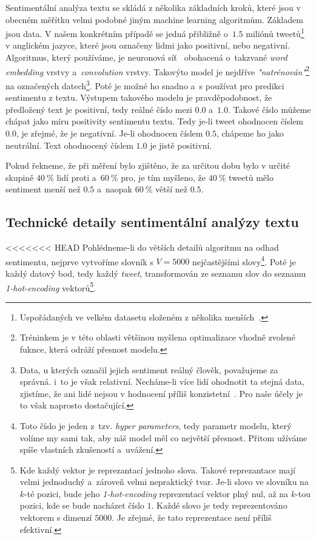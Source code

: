 \documentclass[12pt, a4paper]{article}
\numberwithin{equation}{section} 	%
\begin{document}
Sentimentální analýza textu se skládá z několika základních kroků, které jsou v obecném měřítku velmi podobné jiným machine learning algoritmům. Základem jsou data. V našem konkrétním případě se jedná přibližně o~$1.5$ miliónů tweetů\footnote{Uspořádaných ve velkém datasetu složeném z několika menších~\cite{TwitterData1, TwitterData2}.} v anglickém jazyce, které jsou označeny lidmi jako positivní, nebo negativní. Algoritmus, který používáme, je neuronová síť~\cite{TwitterSentAnalysis} obohacená o~takzvané \textit{word embedding} vrstvy a~\textit{convolution} vrstvy. Takovýto model je nejdříve \textit{"natrénován"}\footnote{Tréninkem je v této oblasti většinou myšlena optimalizace vhodně zvolené fuknce, která odráží přesnost modelu.} na označených datech\footnote{Data, u kterých označil jejich sentiment reálný člověk, považujeme za správná. i~to je však relativní. Necháme-li více lidí ohodnotit ta stejná data, zjistíme, že ani lidé nejsou v hodnocení příliš konzistetní~\cite{HumanVsMachineLearning}. Pro naše účely je to však naprosto dostačující.}. Poté je možné ho snadno a~s používat pro predikci sentimentu z textu. Výstupem takového modelu je pravděpodobnost, že předložený text je positivní, tedy reálné číslo mezi $0.0$ a~$1.0$. Takové číslo můžeme chápat jako míru positivity sentimentu textu. Tedy je-li tweet ohodnocen číslem $0.0$, je zřejmé, že je negativní. Je-li ohodnocen číslem $0.5$, chápeme ho jako neutrální. Text ohodnocený číslem $1.0$ je jistě positivní.

Pokud řekneme, že při měření bylo zjištěno, že za určitou dobu bylo v určité skupině $40~\%$ lidí proti a~$60~\%$ pro, je tím myšleno, že $40~\%$ tweetů mělo sentiment menší než $0.5$ a~naopak $60~\%$ větší než $0.5$.

\subsection{Technické detaily sentimentální analýzy textu}
<<<<<<< HEAD
\noindent Pohlédneme-li do větších detailů algoritmu na odhad sentimentu, nejprve vytvoříme slovník s $V = 5000$ nejčastějšími slovy\footnote{Toto číslo je jeden z~tzv. \textit{hyper parameters}, tedy parametr modelu, který volíme my sami tak, aby náš model měl co největší přesnost. Přitom užíváme spíše vlastních zkušeností a~uvážení.}. Poté je každý datový bod, tedy každý \textit{tweet}, transformován ze seznamu slov do seznamu \textit{1-hot-encoding} vektorů\footnote{Kde každý vektor je reprezantací jednoho slova. Takové reprezantace mají velmi jednoduchý a~zároveň velmi nepraktický tvar. Je-li slovo ve slovníku na $k$-té pozici, bude jeho \textit{1-hot-encoding} reprezentací vektor plný nul, až na $k$-tou pozici, kde se bude nacházet číslo $1$. Každé slovo je tedy reprezentováno vektorem s dimenzí $5000$. Je zřejmé, že tato reprezentace není příliš efektivní.}.
\end{document}
